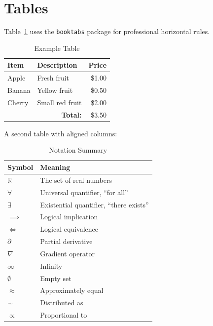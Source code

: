 \documentclass[11pt]{article}
\theoremstyle{definition}
\theoremstyle{plain}
\begin{document}
\section{Tables}
\label{sec:tables}

Table~\ref{tab:fruits} uses the \texttt{booktabs} package for
professional horizontal rules.

\begin{table}[H]
    \centering
    \caption{Example Table}
    \label{tab:fruits}
    \begin{tabular}{llr}
        \toprule
        \textbf{Item} & \textbf{Description} & \textbf{Price} \\
        \midrule
        Apple  & Fresh fruit      & \$1.00 \\
        Banana & Yellow fruit     & \$0.50 \\
        Cherry & Small red fruit  & \$2.00 \\
        \midrule
        \multicolumn{2}{r}{\textbf{Total:}} & \$3.50 \\
        \bottomrule
    \end{tabular}
\end{table}

A second table with aligned columns:

\begin{table}[H]
    \centering
    \caption{Notation Summary}
    \label{tab:notation}
    \begin{tabular}{p{3.5cm} p{6cm}}
        \toprule
        \textbf{Symbol} & \textbf{Meaning} \\
        \midrule
        $\mathbb{R}$  & The set of real numbers \\
        $\forall$     & Universal quantifier, ``for all'' \\
        $\exists$     & Existential quantifier, ``there exists'' \\
        $\implies$    & Logical implication \\
        $\iff$        & Logical equivalence \\
        $\partial$    & Partial derivative \\
        $\nabla$      & Gradient operator \\
        $\infty$      & Infinity \\
        $\emptyset$   & Empty set \\
        $\approx$     & Approximately equal \\
        $\sim$        & Distributed as \\
        $\propto$     & Proportional to \\
        \bottomrule
    \end{tabular}
\end{table}
\end{document}
